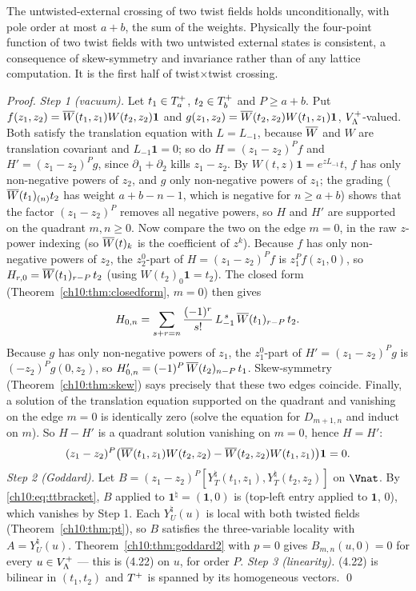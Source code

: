 \begin{physics}
The untwisted-external crossing of two twist fields holds unconditionally, with pole order at most $a+b$, the sum of the weights. Physically the four-point function of two twist fields with two untwisted external states is consistent, a consequence of skew-symmetry and invariance rather than of any lattice computation. It is the first half of twist$\times$twist crossing.
\end{physics}

\emph{Proof.}
\emph{Step 1 (vacuum).}  Let $t_1\in T^{+}_a$, $t_2\in T^{+}_b$ and $P\ge a+b$.  Put
$f(z_1,z_2)=\overline{W}(t_1,z_1)W(t_2,z_2)\mathbf1$ and $g(z_1,z_2)=\overline{W}(t_2,z_2)W(t_1,z_1)\mathbf1$,
$V_{\Lambda}^{+}$-valued.  Both satisfy the translation equation with $L=L_{-1}$, because $\overline{W}$ and
$W$ are translation covariant and $L_{-1}\mathbf 1=0$; so do $H=(z_1-z_2)^Pf$ and
$H'=(z_1-z_2)^Pg$, since $\partial_1+\partial_2$ kills $z_1-z_2$.  By $W(t,z)\mathbf1=e^{zL_{-1}}t$,
$f$ has only non-negative powers of $z_2$, and $g$ only non-negative powers of $z_1$; the grading
($\overline{W}(t_1)_{(n)}t_2$ has weight $a+b-n-1$, which is negative for $n\ge a+b$) shows that the
factor $(z_1-z_2)^P$ removes all negative powers, so $H$ and $H'$ are supported on the quadrant
$m,n\ge0$.  Now compare the two on the edge $m=0$, in the raw $z$-power indexing (so $\overline{W}(t)_k$ is the
coefficient of $z^k$).  Because $f$ has only non-negative powers of $z_2$, the $z_2^0$-part of
$H=(z_1-z_2)^Pf$ is $z_1^Pf(z_1,0)$, so $H_{r,0}=\overline{W}(t_1)_{r-P}\,t_2$ (using
$W(t_2)_0\mathbf 1=t_2$).  The closed form (Theorem~\ref{ch10:thm:closedform}, $m=0$) then gives
\begin{equation*}
 H_{0,n}=\sum_{s+r=n}\frac{(-1)^r}{s!}\,L_{-1}^{\,s}\,\overline{W}(t_1)_{r-P}\,t_2 .
\end{equation*}
Because $g$ has only non-negative powers of $z_1$, the $z_1^0$-part of $H'=(z_1-z_2)^Pg$ is
$(-z_2)^Pg(0,z_2)$, so $H'_{0,n}=(-1)^P\,\overline{W}(t_2)_{n-P}\,t_1$.  Skew-symmetry (Theorem~\ref{ch10:thm:skew}) says precisely that these two edges
coincide.  Finally, a solution of the translation equation supported on the quadrant and
vanishing on the edge $m=0$ is identically zero (solve the equation for $D_{m+1,n}$ and induct on
$m$).  So $H-H'$ is a quadrant solution vanishing on $m=0$, hence $H=H'$:
\begin{equation*}
 (z_1-z_2)^P\bigl(\overline{W}(t_1,z_1)W(t_2,z_2)-\overline{W}(t_2,z_2)W(t_1,z_1)\bigr)\mathbf1=0 .
\end{equation*}
\emph{Step 2 (Goddard).}  Let $B=(z_1-z_2)^P[Y^\natural_T(t_1,z_1),Y^\natural_T(t_2,z_2)]$ on $\Vnat$.
By \eqref{ch10:eq:ttbracket}, $B$ applied to $\mathbf1^\natural=(\mathbf 1,0)$ is (top-left entry
applied to $\mathbf 1$, $0$), which vanishes by Step 1.  Each $Y^\natural_U(u)$ is local with both
twisted fields (Theorem~\ref{ch10:thm:pt}), so $B$ satisfies the three-variable locality with
$A=Y^\natural_U(u)$.  Theorem~\ref{ch10:thm:goddard2} with $p=0$ gives $B_{m,n}(u,0)=0$ for every
$u\in V_{\Lambda}^{+}$ --- this is (4.22) on $u$, for order $P$.
\emph{Step 3 (linearity).}  (4.22) is bilinear in $(t_1,t_2)$ and $T^{+}$ is spanned by its
homogeneous vectors. \qed

